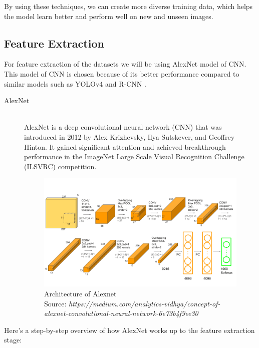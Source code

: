 By using these techniques, we can create more diverse training data, which helps the model learn better and perform well on new and unseen images.




\subsection{Feature Extraction}
\vspace{-18pt}
For feature extraction of the datasets we will be using AlexNet model of CNN. This model of CNN is chosen because of its better performance compared to similar models such as YOLOv4 and R-CNN \cite{Mirchandani}.

\begin{description}
\item[AlexNet] \hfill \\
AlexNet is a deep convolutional neural network (CNN) that was introduced in 2012 by Alex Krizhevsky, Ilya Sutskever, and Geoffrey Hinton. It gained significant attention and achieved breakthrough performance in the ImageNet Large Scale Visual Recognition Challenge (ILSVRC) competition.
\begin{figure}[tbh] %
\begin{center}
	\includegraphics[width=4in]{images/Alexnet2.png}
	\caption[Architecture of Alexnet]{\centering Architecture of Alexnet \\Source: \textit{https://medium.com/analytics-vidhya/concept-of-alexnet-convolutional-neural-network-6e73b4f9ee30}} %
	
	\label{Architecture of Alexnet } %
	
\end{center}
\end{figure}
\end{description}
Here's a step-by-step overview of how AlexNet works up to the feature extraction stage:
